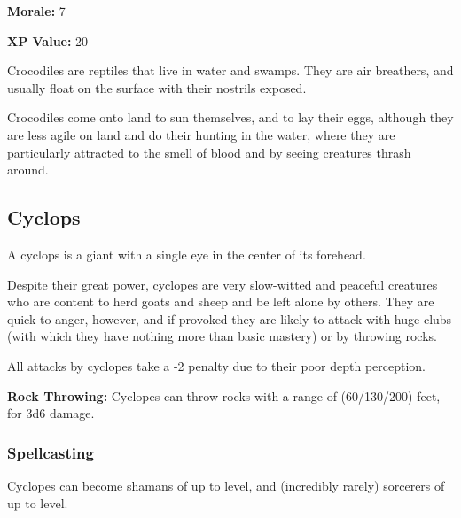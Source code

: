 \begin{multicols*}{2}
{{\textbf{Morale:} 7

\textbf{XP Value:} 20}}

Crocodiles are reptiles that live in water and swamps. They are air breathers, and usually float on the surface with their nostrils exposed.

Crocodiles come onto land to sun themselves, and to lay their eggs, although they are less agile on land and do their hunting in the water, where they are particularly attracted to the smell of blood and by seeing creatures thrash around.

\subsection{Cyclops}

A cyclops is a giant with a single eye in the center of its forehead.

Despite their great power, cyclopes are very slow-witted and peaceful creatures who are content to herd goats and sheep and be left alone by others. They are quick to anger, however, and if provoked they are likely to attack with huge clubs (with which they have nothing more than basic mastery) or by throwing rocks.

All attacks by cyclopes take a -2 penalty due to their poor depth perception.

\textbf{Rock Throwing:} Cyclopes can throw rocks with a range of (60/130/200) feet, for 3d6 damage.

\subsubsection{Spellcasting}
Cyclopes can become shamans of up to  level, and (incredibly rarely) sorcerers of up to  level.


\end{multicols*}
